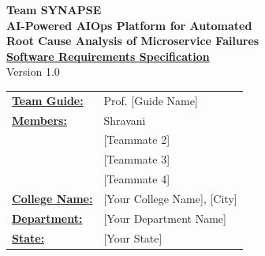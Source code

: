 \documentclass[11pt,a4paper]{article}
\newcommand{\ProjectVersion}{Version 1.0}
\newcommand{\DocumentTitle}{Software Requirements Specification}
\newcommand{\TeamName}{Team SYNAPSE}
\newcommand{\CollegeName}{[Your College Name], [City]}
\newcommand{\DepartmentName}{[Your Department Name]}
\newcommand{\StateName}{[Your State]}
\newcommand{\GuideName}{Prof. [Guide Name]}
\renewcommand{\arraystretch}{1.25}
\begin{document}

\thispagestyle{firstpage}

\vspace*{0.55cm}

\begin{center}
    {\Large\bfseries \TeamName}\\[0.65cm]

    {\fontsize{21}{25}\selectfont\bfseries
    AI-Powered AIOps Platform for Automated\\
    Root Cause Analysis of Microservice Failures}\\[0.75cm]

    {\large\bfseries\underline{\DocumentTitle}}\\[0.65cm]

    {\large \ProjectVersion}
\end{center}

\vspace{1.0cm}

\begin{flushleft}
\renewcommand{\arraystretch}{1.28}
\begin{tabular}{@{}p{3.35cm}p{11.0cm}@{}}

\textbf{\underline{Team Guide:}} & \GuideName \\[0.08cm]

\textbf{\underline{Members:}} & Shravani \\
& [Teammate 2] \\
& [Teammate 3] \\
& [Teammate 4] \\[0.08cm]

\textbf{\underline{College Name:}} & \CollegeName \\[0.08cm]

\textbf{\underline{Department:}} & \DepartmentName \\[0.08cm]

\textbf{\underline{State:}} & \StateName

\end{tabular}
\end{flushleft}

\clearpage


\thispagestyle{srsstyle}
\end{document}
